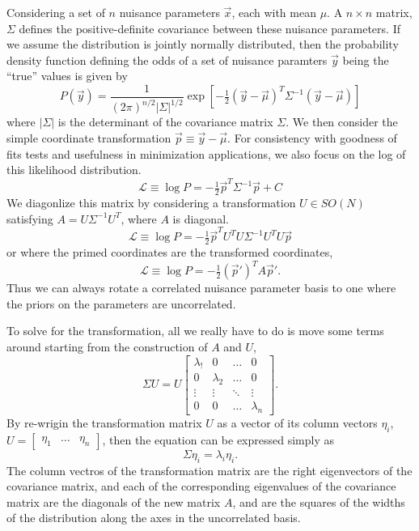 \documentclass[main.tex]{subfiles}
\begin{document}
Considering a set of $n$ nuisance parameters $\vec{x}$, each with mean $\mu$.
A $n\times n$ matrix, $\Sigma$ defines the positive-definite covariance between these nuisance parameters. 
If we assume the distribution is jointly normally distributed, then the probability density function defining the odds of a set of nuisance paramters $\vec{y}$ being the ``true'' values is given by
\begin{equation}
    P(\vec{y}) = \dfrac{1}{(2\pi)^{n/2}\left|\Sigma\right|^{1/2}}\exp\left[-\tfrac{1}{2}(\vec{y}-\vec{\mu})^{T}\Sigma^{-1}\left(\vec{y}-\vec{\mu}\right)\right]
\end{equation}
where $\left|\Sigma\right|$ is the determinant of the covariance matrix $\Sigma$. 
We then consider the simple coordinate transformation $ \vec{p}\equiv \vec{y}-\vec{\mu}$.
For consistency with goodness of fits tests and usefulness in minimization applications, we also focus on the log of this likelihood distribution. 
\begin{equation}
\mathcal{L} \equiv \log P = -\tfrac{1}{2}\vec{p}^{T}\Sigma^{-1}\vec{p} + C
\end{equation}
We diagonlize this matrix by considering a transformation $U\in SO(N)$ satisfying $A = U\Sigma^{-1}U^{T}$, where $A$ is diagonal. 
\begin{equation}
    \mathcal{L} \equiv \log P = -\tfrac{1}{2}\vec{p}^{T} U^{T} U\Sigma^{-1} U^{T} U\vec{p}
\end{equation}
or where the primed coordinates are the transformed coordinates,
\begin{equation}
    \mathcal{L} \equiv \log P = -\tfrac{1}{2}(\vec{p}')^{T} A \vec{p}'.
\end{equation}
Thus we can always rotate a correlated nuisance parameter basis to one where the priors on the parameters are uncorrelated. 

To solve for the transformation, all we really have to do is move some terms around starting from the construction of $A$ and $U$, 
\begin{equation} 
    \Sigma U =  U\left[ \begin{array}{cccc}\lambda_{!} & 0 & \ldots & 0 \\
        0 & \lambda_{2} & \ldots & 0 \\
        \vdots & \vdots & \ddots & \vdots \\
        0 & 0 & \ldots & \lambda_{n} \end{array}\right].
\end{equation}
By re-wrigin the transformation matrix $U$ as a vector of its column vectors $\eta_{i}$, $U=\left[\begin{array}{ccc}\eta_{1} & \ldots & \eta_{n} \end{array}\right]$, then the equation can be expressed simply as 
\begin{equation}
    \Sigma \eta_{i} = \lambda_{i}\eta_{i}.
\end{equation}
The column vectros of the transformation matrix are the right eigenvectors of the covariance matrix, and each of the corresponding eigenvalues of the covariance matrix are the diagonals of the new matrix $A$, and are the squares of the widths of the distribution along the axes in the uncorrelated basis. 
\end{document}
